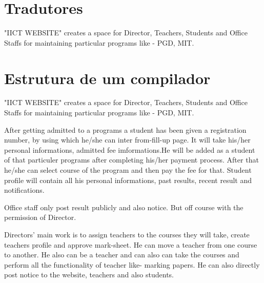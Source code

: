 \documentclass{scrreprt}
\begin{document}
\section{Tradutores}
"IICT WEBSITE" creates a space for Director, Teachers, Students and Office Staffs for maintaining particular programs like - PGD, MIT. 

\section{Estrutura de um compilador}
"IICT WEBSITE" creates a space for Director, Teachers, Students and Office Staffs for maintaining particular programs like - PGD, MIT.

After getting admitted to a programs a student has been given a registration number, by using which he/she can inter from-fill-up page. It will take his/her personal informations, admitted fee imformations.He will be added as a student of that particuler programs after completing his/her payment process. After that he/she can select course of the program and then pay the fee for that. Student profile will contain all his personal informations, past results, recent result and notifications.

Office staff only post result publicly and also notice. But off course with the permission of Director.  

Directors' main work is to assign teachers to the courses they will take, create teachers profile and approve mark-sheet. He can move a teacher from one course to another. He also can be a teacher and can also can take the courses and perform all the functionality of teacher like- marking papers. He can also directly post notice to the website, teachers and also students.
\newline
\end{document}
